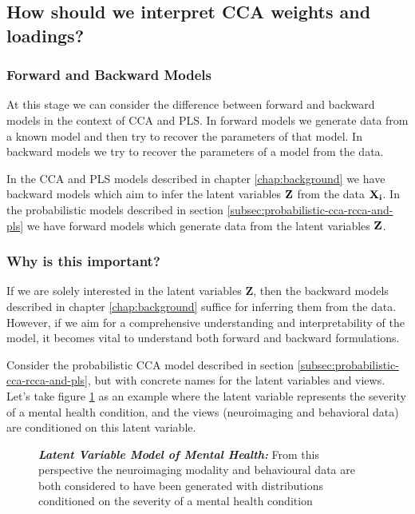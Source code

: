 \subsection{How should we interpret CCA weights and loadings?}


\subsubsection{Forward and Backward Models}

At this stage we can consider the difference between forward and backward models in the context of CCA and PLS.
In forward models we generate data from a known model and then try to recover the parameters of that model.
In backward models we try to recover the parameters of a model from the data.

In the CCA and PLS models described in chapter \ref{chap:background} we have backward models which aim to infer the
latent variables $\bold{Z}$ from the data $\bold{X_i}$.
In the probabilistic models described in section \ref{subsec:probabilistic-cca-rcca-and-pls} we have forward models which
generate data from the latent variables $\bold{Z}$.

\subsubsection{Why is this important?}

If we are solely interested in the latent variables $\boldsymbol{Z}$, then the backward models described in chapter \ref{chap:background} suffice for inferring them from the data.
However, if we aim for a comprehensive understanding and interpretability of the model, it becomes vital to understand both forward and backward formulations.

Consider the probabilistic CCA model described in section \ref{subsec:probabilistic-cca-rcca-and-pls}, but with concrete names for the latent variables and views. Let's take figure \ref{fig:mentalhealthselfsupervised} as an example where the latent variable represents the severity of a mental health condition, and the views (neuroimaging and behavioral data) are conditioned on this latent variable.


\begin{figure}
    \centering
    \caption[Latent Variable Model of Mental Health]{\textit{\textbf{Latent Variable Model of Mental Health:}} From this perspective the neuroimaging modality and behavioural data are both considered to have been generated with distributions conditioned on the severity of a mental health condition}\label{fig:mentalhealthselfsupervised}
\end{figure}

